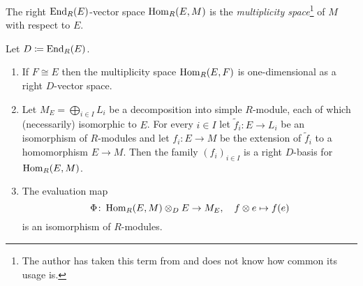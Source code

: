 \begin{definition}
  The right $\operatorname{End}_R(E)$-vector space $\operatorname{Hom}_R(E,M)$ is the \emph{multiplicity space}\footnote{
  The author has taken this term from \cite{AP2012DoubleCommutant} and does not know how common its usage is.
  } of $M$ with respect to $E$.
\end{definition}


\begin{proposition}
  \label{proposition: multiplicity spaces}
    Let $D \coloneqq \operatorname{End}_R(E)$.
    \begin{enumerate}
    \item
      \label{enumerate: one-dimensional as D vector space}
      If $F \cong E$ then the multiplicity space $\operatorname{Hom}_R(E,F)$ is one-dimensional as a right $D$-vector space.
    \item
      \label{enumerate: basis of multiplicity space}
      Let $M_E = \bigoplus_{i \in I} L_i$ be a decomposition into simple $R$-module, each of which (necessarily) isomorphic to $E$.
      For every $i \in I$ let $\tilde{f}_i \colon E \to L_i$ be an isomorphism of $R$-modules and let $f_i \colon E \to M$ be the extension of $\tilde{f}_i$ to a homomorphism $E \to M$.
      Then the family $(f_i)_{i \in I}$ is a right $D$-basis for $\operatorname{Hom}_R(E,M)$.
    \item
      The evaluation map
      \[
                \Phi
        \colon  \operatorname{Hom}_R(E,M) \mathbin{\otimes}_D E
        \to     M_E,
        \quad   f \mathbin{\otimes} e
        \mapsto f(e)
      \]
      is an isomorphism of $R$-modules.
  \end{enumerate}
\end{proposition}


